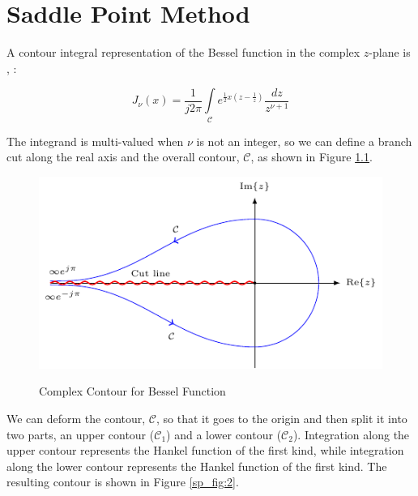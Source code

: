 \chapter{Saddle Point Method}\label{appendix_saddle_point_method}
A contour integral representation of the Bessel function in the complex $z$-plane is \cite{arfken_weber}, \cite{nist_handbook}:

\begin{equation}
  J_{\nu}(x) = \frac{1}{j2\pi}\int\limits_{\mathcal{C}}e^{\frac{1}{2}x\left(z- \frac{1}{z} \right)} \frac{dz}{z^{\nu+1}}
  \label{sp_eq:1}
\end{equation}
\renewcommand{\baselinestretch}{2} \small\normalsize

The integrand is multi-valued when $\nu$ is not an integer, so we can define a branch cut along the real axis and the overall contour, $\mathcal{C}$, as shown in Figure \ref{sp_fig:1}.

\begin{figure}[H]
  \begin{center}
\includegraphics[width=5in]{../media/hankel_contours-figure0.pdf}
  \end{center}
  \renewcommand{\baselinestretch}{1} \small\normalsize
  \begin{quote}
    \caption[Complex Contour for Bessel Function]{ Complex Contour for Bessel Function\label{sp_fig:1}}
  \end{quote}
\end{figure}
\renewcommand{\baselinestretch}{2} \small\normalsize

We can deform the contour, $\mathcal{C}$, so that it goes to the origin and then split it into two parts, an upper contour ($\mathcal{C}_1$) and a lower contour ($\mathcal{C}_2$). Integration along the upper contour represents the Hankel function of the first kind, while integration along the lower contour represents the Hankel function of the first kind. The resulting contour is shown in Figure \ref{sp_fig:2}.

